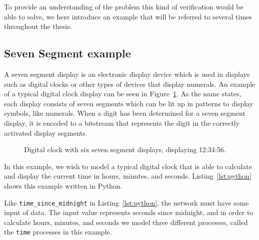 To provide an understanding of the problem this kind of verification would be able to solve, we here introduce an example that will be referred to several times throughout the thesis.

\subsection{Seven Segment example}
\label{sec:example-seven_segment_intro}
A seven segment display is an electronic display device which is used in displays such as digital clocks or other types of devices that display numerals. An example of a typical digital clock display can be seen in Figure~\ref{fig:6_displays}. As the name states, each display consists of seven segments which can be lit up in patterns to display symbols, like numerals.
When a digit has been determined for a seven segment display, it is encoded to a bitstream that represents the digit in the correctly activated display segments.
\begin{figure}[!ht]
  \begin{center}
  \end{center}
  \caption{Digital clock with six seven segment displays, displaying 12:34:56.}
  \label{fig:6_displays}
\end{figure}
In this example, we wish to model a typical digital clock that is able to calculate and display the current time in hours, minutes, and seconds. Listing~\ref{lst:python} shows this example written in Python.

Like \texttt{time\_since\_midnight} in Listing~\ref{lst:python}, the network must have some input of data. The input value represents seconds since midnight, and in order to calculate hours, minutes, and seconds we model three different processes, called the \texttt{time} processes in this example.

